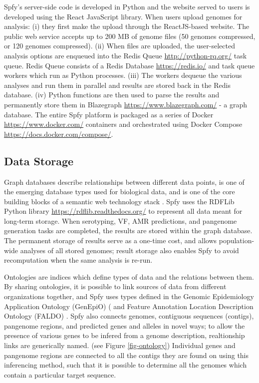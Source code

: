 \documentclass[a4,center,fleqn]{NAR}
\begin{document}
Spfy's server-side code is developed in Python and the website served to users is developed using the React JavaScript library.
When users upload genomes for analysis: (i) they first make the upload through the ReactJS-based website.
The public web service accepts up to 200 MB of genome files (50 genomes compressed, or 120 genomes compressed).
(ii) When files are uploaded, the user-selected analysis options are enqueued into the Redis Queue \url{http://python-rq.org/} task queue.
Redis Queue consists of a Redis Database \url{https://redis.io/} and task queue workers which run as Python processes.
(iii) The workers dequeue the various analyses and run them in parallel and results are stored back in the Redis database.
(iv) Python functions are then used to parse the results and permanently store them in Blazegraph \url{https://www.blazegraph.com/} - a graph database.
The entire Spfy platform is packaged as a series of Docker \url{https://www.docker.com/} containers and orchestrated using Docker Compose \url{https://docs.docker.com/compose/}.

\subsection{Data Storage}
Graph databases describe relationships between different data points, is one of the emerging \cite{de2015trends} database types used for biological data, and is one of the core building blocks of a semantic web technology stack \cite{horrocks2005semantic}.
Spfy uses the RDFLib Python library \url{https://rdflib.readthedocs.org/} to represent all data meant for long-term storage.
When serotyping, VF, AMR predictions, and pangenome generation tasks are completed, the results are stored within the graph database.
The permanent storage of results serve as a one-time cost, and allows population-wide analyses of all stored genomes; result storage also enables Spfy to avoid recomputation when the same analysis is re-run.

Ontologies are indices which define types of data and the relations between them.
By sharing ontologies, it is possible to link sources of data from different organizations together, and Spfy uses types defined in the  Genomic Epidemiology Application Ontology (GenEpiO) (\cite{griffiths2017context} and Feature Annotation Location Description Ontology (FALDO) \cite{bolleman2016faldo}.
Spfy also connects genomes, contiguous sequences (contigs), pangenome regions, and predicted genes and alleles in novel ways; to allow the presence of various genes to be infered from a genome description, realtionship links are generically named.
(see Figure \ref{fig-ontology})
Individual genes and pangenome regions are connected to all the contigs they are found on using this inferencing method, such that it is possible to determine all the genomes which contain a particular target sequence.
\end{document}
